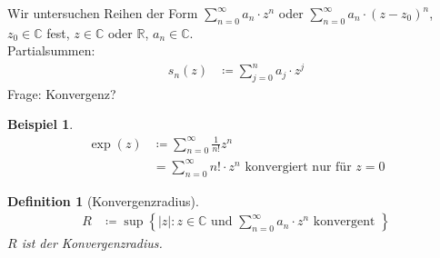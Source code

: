 \documentclass[11pt, twoside, a4paper]{article}
\theoremstyle{plain}
\newtheorem{definition}[blockelement]{Definition}
\newtheorem{beispiel}[blockelement]{Beispiel}
\newcommand{\set}[1]{\left\{#1\right\}}
\newcommand{\pair}[1]{\left(#1\right)}
\newcommand{\abs}[1]{\left\lvert#1\right\rvert}
\newcommand{\definedas}[0]{\coloneqq}
\newcommand{\R}{\mathbb{R}}
\newcommand{\C}{\mathbb{C}}
\begin{document}
    Wir untersuchen Reihen der Form $ \sum_{n=0}^{\infty} a_n\cdot z^n$ oder $ \sum_{n=0}^{\infty} a_n \cdot \pair{z-z_0}^n$, $z_0\in\C$ fest, $z\in\C$ oder $\R$, $a_n\in\C$.\\
    Partialsummen:
    \begin{align*}
        s_n(z) &\definedas \sum_{j=0}^{n} a_j\cdot z^j
    \end{align*}
    Frage: Konvergenz?
    \begin{beispiel}
        \begin{align*}
            \exp(z) &\definedas \sum_{n=0}^{\infty} \frac{1}{n!} z^n\\
            &= \sum_{n=0}^{\infty} n! \cdot z^n \text{ konvergiert nur für } z=0
        \end{align*}
    \end{beispiel}

    \begin{definition}[Konvergenzradius]
        \begin{align*}
            R &\definedas \sup \set{\abs{z}: z\in\C \text{ und } \sum_{n=0}^{\infty} a_n \cdot z^n \text{ konvergent } }
        \end{align*}
        $R$ ist der Konvergenzradius.
    \end{definition}
\end{document}
